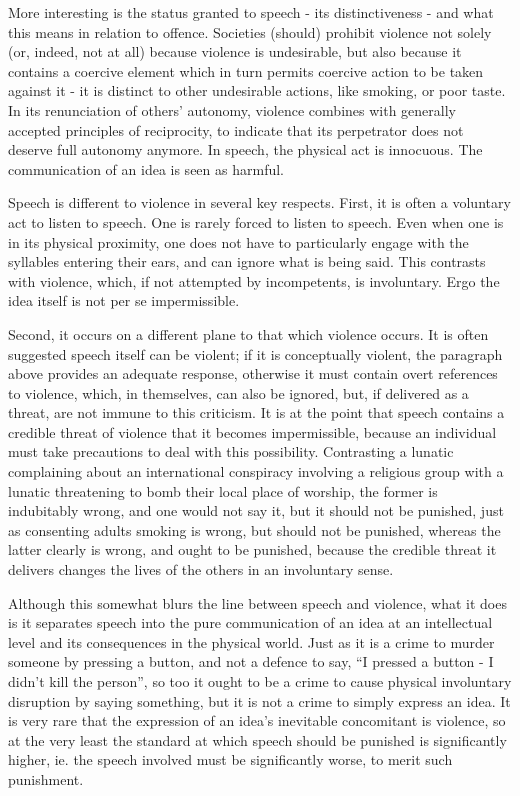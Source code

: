 \documentclass[10pt,a4paper,twoside]{article}
\begin{document}
\begin{multicols}{2}
More interesting is the status granted to speech - its distinctiveness -
and what this means in relation to offence. Societies (should) prohibit
violence not solely (or, indeed, not at all) because violence is
undesirable, but also because it contains a coercive element which in
turn permits coercive action to be taken against it - it is distinct to
other undesirable actions, like smoking, or poor taste. In its
renunciation of others' autonomy, violence combines with generally
accepted principles of reciprocity, to indicate that its perpetrator
does not deserve full autonomy anymore. In speech, the physical act is
innocuous. The communication of an idea is seen as harmful.

Speech is different to violence in several key respects. First, it is
often a voluntary act to listen to speech. One is rarely forced to
listen to speech. Even when one is in its physical proximity, one does
not have to particularly engage with the syllables entering their ears,
and can ignore what is being said. This contrasts with violence, which,
if not attempted by incompetents, is involuntary. Ergo the idea itself
is not per se impermissible.

Second, it occurs on a different plane to that which violence occurs. It
is often suggested speech itself can be violent; if it is conceptually
violent, the paragraph above provides an adequate response, otherwise it
must contain overt references to violence, which, in themselves, can
also be ignored, but, if delivered as a threat, are not immune to this
criticism. It is at the point that speech contains a credible threat of
violence that it becomes impermissible, because an individual must take
precautions to deal with this possibility. Contrasting a lunatic
complaining about an international conspiracy involving a religious
group with a lunatic threatening to bomb their local place of worship,
the former is indubitably wrong, and one would not say it, but it should
not be punished, just as consenting adults smoking is wrong, but should
not be punished, whereas the latter clearly is wrong, and ought to be
punished, because the credible threat it delivers changes the lives of
the others in an involuntary sense.

Although this somewhat blurs the line between speech and violence, what
it does is it separates speech into the pure communication of an idea at
an intellectual level and its consequences in the physical world. Just
as it is a crime to murder someone by pressing a button, and not a
defence to say, ``I pressed a button - I didn't kill the person'', so
too it ought to be a crime to cause physical involuntary disruption by
saying something, but it is not a crime to simply express an idea. It is
very rare that the expression of an idea's inevitable concomitant is
violence, so at the very least the standard at which speech should be
punished is significantly higher, ie. the speech involved must be
significantly worse, to merit such punishment.


\end{multicols}
\end{document}
